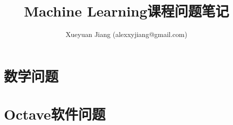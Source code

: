 \documentclass[UTF8]{ctexart}
\begin{document}
\title{Machine Learning课程问题笔记}
\author{Xueyuan Jiang (alexxyjiang@gmail.com)}
\date{}
\maketitle
\pagestyle{plain}

\section{数学问题}
\begin{enumerate}

\end{enumerate}
\section{Octave软件问题}
\begin{enumerate}

\end{enumerate}
\end{document}
